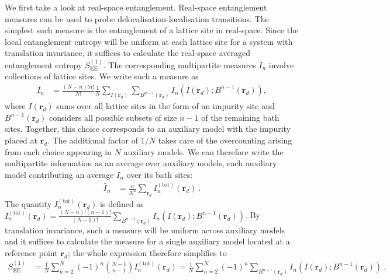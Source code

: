 We first take a look at real-space entanglement. Real-space entanglement measures can be used to probe delocalisation-localisation transitions. The simplest such measure is the entanglement of a lattice site in real-space. Since the local entanglement entropy will be uniform at each lattice site for a system with translation invariance, it suffices to calculate the real-space averaged entanglement entropy \(S_\text{EE}^{(1)}\). The corresponding multipartite measures \(\bar I_n\) involve collections of lattice sites. We write such a measure as
\begin{equation}\begin{aligned}
	\bar I_n &= \frac{(N-n)! n!}{N!} \frac{1}{N}\sum_{I(\bm r_d)} \sum_{B^{n-1}(\bm r_d)} I_n(I(\bm r_d); B^{n-1}(\bm r_d)),
\end{aligned}\end{equation}
where \(I(\bm r_d)\) sums over all lattice sites in the form of an impurity site and \(B^{n-1}(\bm r_d)\) considers all possible subsets of size \(n-1\) of the remaining bath sites. Together, this choice corresponds to an auxiliary model with the impurity placed at \(\bm r_d\). The additional factor of \(1/N\) takes care of the overcounting arising from each choice appearing in \(N\) auxiliary models. We can therefore write the multipartite information as an average over auxiliary models, each auxiliary model contributing an average \(I_n\) over its bath sites:
\begin{equation}\begin{aligned}
	\bar I_n &= \frac{n}{N^2} \sum_{\bm r_d} I_n^{(\text{tot})}(\bm r_d)~.
\end{aligned}\end{equation}
The quantity \(I_n^{(\text{tot})}(\bm r_d)\) is defined as \(I_n^{(\text{tot})}(\bm r_d) = \frac{(N-n)! (n-1)!}{(N-1)!} \sum_{B^{n-1}(\bm r_d)} I_n(I(\bm r_d); B^{n-1}(\bm r_d))\). By translation invariance, such a measure will be uniform across auxiliary models and it suffices to calculate the measure for a single auxiliary model located at a reference point \(\bm r_d\); the whole expression therefore simplifies to
\begin{equation}\begin{aligned}
	S_\text{EE}^{(1)} &= \frac{1}{N}\sum_{n=2}^N (-1)^{n} \binom{N - 1}{n - 1} I_n^{(\text{tot})}(\bm r_d) = \frac{1}{N}\sum_{n=2}^N (-1)^{n} \sum_{B^{n-1}(\bm r_d)} I_n(I(\bm r_d); B^{n-1}(\bm r_d))~.
\end{aligned}\end{equation}

